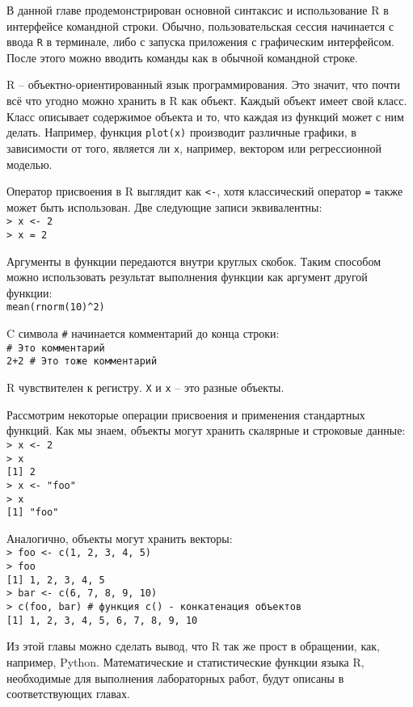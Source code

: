     В данной главе продемонстрирован основной синтаксис и использование R в интерфейсе 
    командной строки. Обычно, пользовательская сессия начинается с ввода \texttt{R} в 
    терминале, либо с запуска приложения с графическим интерфейсом. После этого можно вводить
    команды как в обычной командной строке.

    \indent R -- объектно-ориентированный язык программирования. Это значит, что почти всё что 
    угодно можно хранить в R как объект. Каждый объект имеет свой класс. Класс описывает
    содержимое объекта и то, что каждая из функций может с ним делать. Например, функция
    \texttt{plot(x)} производит различные графики, в зависимости от того, является ли 
    \texttt{x}, например, вектором или регрессионной моделью. 
    
    \indent Оператор присвоения в R выглядит как \texttt{<-}, хотя классический оператор 
    \texttt{=} также может быть использован. Две следующие записи эквивалентны: \\
    \indent \texttt{> x <- 2} \\
    \indent \texttt{> x = 2} 
    
    \indent Аргументы в функции передаются внутри круглых скобок. Таким способом можно 
    использовать результат выполнения функции как аргумент другой функции: \\
    \indent \texttt{mean(rnorm(10)\^{}2)} 
    
    \indent C символа \texttt{\#} начинается комментарий до конца строки: \\
    \indent \texttt{\# Это комментарий} \\
    \indent \texttt{2+2 \# Это тоже комментарий} 
    
    \indent R чувствителен к регистру. \texttt{X} и \texttt{x} -- это разные объекты. 
    
    \indent Рассмотрим некоторые операции присвоения и применения стандартных функций. Как мы
    знаем, объекты могут хранить скалярные и строковые данные: \\
    \indent \texttt{> x <- 2} \\
    \indent \texttt{> x} \\
    \indent \texttt{[1] 2} \\
    \indent \texttt{> x <- "foo"} \\
    \indent \texttt{> x } \\
    \indent \texttt{[1] "foo"} 
    
    \indent Аналогично, объекты могут хранить векторы: \\
    \indent \texttt{> foo <- c(1, 2, 3, 4, 5)} \\
    \indent \texttt{> foo} \\
    \indent \texttt{[1] 1, 2, 3, 4, 5} \\
    \indent \texttt{> bar <- c(6, 7, 8, 9, 10)} \\
    \indent \texttt{> c(foo, bar) \# функция c() - конкатенация объектов} \\
    \indent \texttt{[1] 1, 2, 3, 4, 5, 6, 7, 8, 9, 10} 

    \indent Из этой главы можно сделать вывод, что R так же прост в обращении, как, например, 
    Python. Математические и статистические функции языка R, необходимые для выполнения 
    лабораторных работ, будут описаны в соответствующих главах.
    

